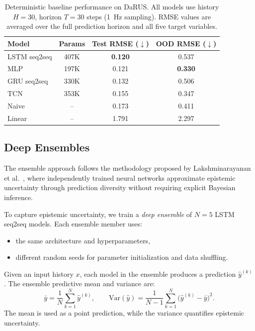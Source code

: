 \documentclass[a4paper,fleqn]{cas-sc}
\begin{document}
\begin{table}[t]
    \centering
    \caption{Deterministic baseline performance on DaRUS. All models use history $H=30$, horizon $T=30$ steps (1~Hz sampling). RMSE values are averaged over the full prediction horizon and all five target variables.}
    \label{tab:baseline-rmse}
    \begin{tabular}{lccc}
        \toprule
        \textbf{Model} & \textbf{Params} & \textbf{Test RMSE ($\downarrow$)} & \textbf{OOD RMSE ($\downarrow$)} \\
        \midrule
        LSTM seq2seq  & 407K & \textbf{0.120} & 0.537 \\
        MLP           & 197K & 0.121          & \textbf{0.330} \\
        GRU seq2seq   & 330K & 0.132          & 0.506 \\
        TCN           & 353K & 0.155          & 0.347 \\
        Naive         & --   & 0.173          & 0.411 \\
        Linear        & --   & 1.791          & 2.297 \\
        \bottomrule
    \end{tabular}
\end{table}

\subsection{Deep Ensembles}

The ensemble approach follows the methodology proposed by Lakshminarayanan et al.~\cite{lakshminarayanan2017}, where independently trained neural networks approximate epistemic uncertainty through prediction diversity without requiring explicit Bayesian inference.


To capture epistemic uncertainty, we train a \emph{deep ensemble} of \(N=5\) LSTM seq2seq models. Each ensemble member uses:
\begin{itemize}
    \item the same architecture and hyperparameters,
    \item different random seeds for parameter initialization and data shuffling.
\end{itemize}

Given an input history \(x\), each model in the ensemble produces a prediction \(\hat{y}^{(k)}\). The ensemble predictive mean and variance are:
\[
\bar{y} = \frac{1}{N} \sum_{k=1}^{N} \hat{y}^{(k)}, \qquad
\mathrm{Var}(\hat{y}) = \frac{1}{N-1} \sum_{k=1}^{N} \bigl(\hat{y}^{(k)} - \bar{y}\bigr)^2.
\]
The mean is used as a point prediction, while the variance quantifies epistemic uncertainty.
\end{document}
